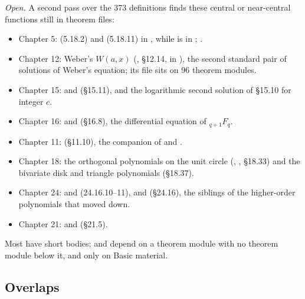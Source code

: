 \documentclass[11pt,a4paper]{article}
\newcommand{\open}{\textit{Open.}}
\begin{document}
\open{} A second pass over the 373 definitions finds these central or near-central functions
still in theorem files:
\begin{itemize}
  \item Chapter 5:  (5.18.2) and  (5.18.11) in
    , while  is in ;
    .
  \item Chapter 12: Weber's \(W(a,x)\) (, \S12.14, in
    ), the second standard pair of solutions of
    Weber's equation; its file sits on 96 theorem modules.
  \item Chapter 15:  and  (\S15.11), and the
    logarithmic second solution  of \S15.10 for integer \(c\).
  \item Chapter 16:  and  (\S16.8), the differential
    equation of \({}_{q+1}F_q\).
  \item Chapter 11:  (\S11.10), the companion of  and
    .
  \item Chapter 18: the orthogonal polynomials on the unit circle
    (, , \S18.33) and the bivariate disk and
    triangle polynomials (\S18.37).
  \item Chapter 24:  and  (24.16.10--11),
     and  (\S24.16), the siblings of the
    higher-order polynomials that moved down.
  \item Chapter 21:  and  (\S21.5).
\end{itemize}
Most have short bodies;  and  depend on a theorem module with no
theorem module below it, and  only on Basic material.

\subsection{Overlaps}
\end{document}
